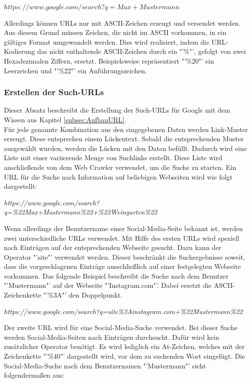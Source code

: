 			$https://www.google.com/search?q=Max+Mustermann$
			
			Allerdings können URLs nur mit ASCII-Zeichen erzeugt und versendet werden. Aus diesem Grund müssen Zeichen, die nicht im ASCII vorkommen, in ein gültiges Format umgewandelt werden. Dies wird realisiert, indem die URL-Kodierung das nicht enthaltende ASCII-Zeichen durch ein "'\%"', gefolgt von zwei Hexadezimalen Ziffern, ersetzt. Beispielsweise repräsentiert "'\%20"' ein Leerzeichen und "'\%22"' ein Anführungszeichen. \cite{HTMLURL} \\
			
			\subsubsection{Erstellen der Such-URLs}
			Dieser Absatz beschreibt die Erstellung der Such-URLs für Google mit dem Wissen aus Kapitel \ref{subsec:AufbauURL}.\\
			Für jede genannte Kombination aus den eingegebenen Daten werden Link-Muster erzeugt. Diese entsprechen einem Lückentext. Sobald die entsprechenden Muster ausgewählt wurden, werden die Lücken mit den Daten befüllt. Dadurch wird eine Liste mit einer variierende Menge von Suchlinks erstellt. Diese Liste wird anschließende von dem Web Crawler verwendet, um die Suche zu starten.
			Ein URL für die Suche nach Information auf beliebigen Webseiten wird wie folgt dargestellt:
					
			\textit{https://www.google.com/search?q=\%22Max+Mustermann\%22+\%22Weingarten\%22}
			
			Wenn allerdings der Benutzername einer Social-Media-Seite bekannt ist, werden zwei unterschiedliche URLs verwendet. Mit Hilfe des ersten URLs wird speziell nach Einträgen auf der entsprechenden Webseite gesucht. Dazu kann der Operator "'site"' verwendet werden. Dieser beschränkt die Suchergebnisse soweit, dass die vorgeschlagenen Einträge ausschließlich auf einer festgelegten Webseite vorkommen. Das folgende Beispiel beschreibt die Suche nach dem Benutzer "'Mustermann"' auf der Webseite "'Instagram.com"'. Dabei ersetzt die ASCII-Zeichenkette "'\%3A"' den Doppelpunkt. \cite{HTMLURL}
			
			\textit{https://www.google.com/search?q=site\%3Ainstagram.com+\%22Mustermann\%22}
			
			Der zweite URL wird für eine Social-Media-Suche verwendet. Bei dieser Suche werden Social-Media-Seiten nach Einträgen durchsucht. Dafür wird kein zusätzlicher Operator benötigt. Es wird lediglich ein At-Zeichen, welches mit der Zeichenkette "'\%40"' dargestellt wird, vor dem zu suchenden Wort eingefügt. Die Social-Media-Suche nach dem Benutzernamen "'Mustermann"' sieht folgendermaßen aus:\cite{SocialMediaSearch}
			
